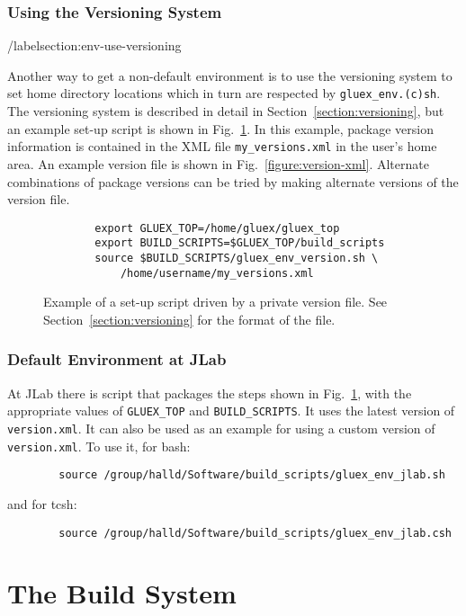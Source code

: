 \documentclass[12pt]{article}
\begin{document}
\subsubsection{Using the Versioning System}/label{section:env-use-versioning}

Another way to get a non-default environment is to use the versioning
system to set home directory locations which in turn are respected by
{\tt gluex\_env.(c)sh}. The versioning system is described in detail
in Section~\ref{section:versioning}, but an example set-up script is
shown in Fig.~\ref{figure:version-script}. In this example, package version
information is contained in the XML file {\tt my\_versions.xml} in the
user's home area. An example version file is shown in Fig.~\ref{figure:version-xml}. Alternate combinations of package versions can be tried by making alternate versions of the version file.

\begin{figure}
\begin{verbatim}
        export GLUEX_TOP=/home/gluex/gluex_top
        export BUILD_SCRIPTS=$GLUEX_TOP/build_scripts
        source $BUILD_SCRIPTS/gluex_env_version.sh \
            /home/username/my_versions.xml
\end{verbatim}
\caption{Example of a set-up script driven by a private version
  file. See Section~\ref{section:versioning} for the format of the
  file.}\label{figure:version-script}
\end{figure}

\subsubsection{Default Environment at JLab}

At JLab there is script that packages the steps shown in Fig.~\ref{figure:version-script}, with the appropriate values of {\tt GLUEX\_TOP} and {\tt BUILD\_SCRIPTS}. It uses the latest version of {\tt version.xml}. It can also be used as an example for using a custom version of {\tt version.xml}. To use it, for bash:
\begin{verbatim}
        source /group/halld/Software/build_scripts/gluex_env_jlab.sh
\end{verbatim}
and for tcsh:
\begin{verbatim}
        source /group/halld/Software/build_scripts/gluex_env_jlab.csh
\end{verbatim}

\section{The Build System}
\end{document}
